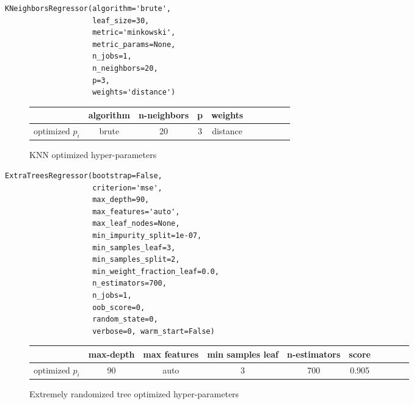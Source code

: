 \begin{tcolorbox}
\begin{verbatim}
KNeighborsRegressor(algorithm='brute',
                    leaf_size=30, 
                    metric='minkowski',
                    metric_params=None,
                    n_jobs=1,
                    n_neighbors=20,
                    p=3,
                    weights='distance')
\end{verbatim}
\end{tcolorbox}
\begin{figure}[H]
\centering 
\begin{tabular}{l*{8}{c}r}
\hline
            & algorithm &n-neighbors&p &weights \\
\hline
optimized $p_i$ &brute&20& 3 & distance \\
\end{tabular}
\caption{KNN optimized hyper-parameters }
\end{figure}
\begin{tcolorbox}
\begin{verbatim}
ExtraTreesRegressor(bootstrap=False, 
                    criterion='mse',
                    max_depth=90,
                    max_features='auto',
                    max_leaf_nodes=None,
                    min_impurity_split=1e-07,
                    min_samples_leaf=3,
                    min_samples_split=2, 
                    min_weight_fraction_leaf=0.0,
                    n_estimators=700,
                    n_jobs=1, 
                    oob_score=0,
                    random_state=0,
                    verbose=0, warm_start=False)
\end{verbatim}
\end{tcolorbox}

\begin{figure}[H]
\centering 
\begin{tabular}{l*{8}{c}r}
\hline
            & max-depth &max features&min samples leaf &n-estimators& score \\
\hline
optimized $p_i$  & 90 & auto & 3 & 700 &0.905 \\
\end{tabular}
\caption{Extremely randomized tree optimized hyper-parameters }
\end{figure}

